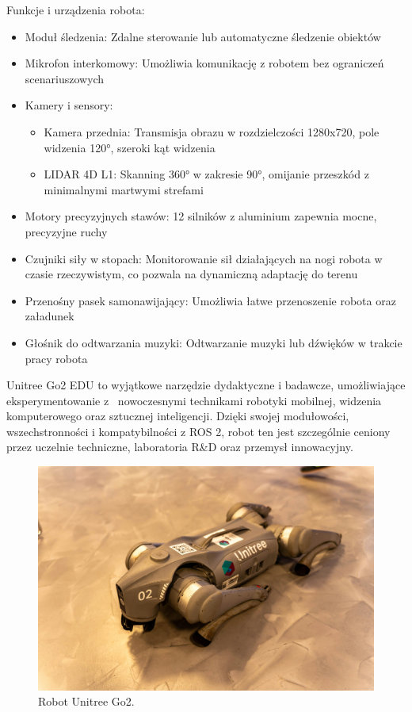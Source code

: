 \documentclass[12pt]{article}
\begin{document}
Funkcje i urządzenia robota:
\begin{itemize}
    \item Moduł śledzenia: Zdalne sterowanie lub automatyczne śledzenie obiektów
    \item Mikrofon interkomowy: Umożliwia komunikację z robotem bez ograniczeń scenariuszowych
    \item Kamery i sensory:
    \begin{itemize}
        \item Kamera przednia: Transmisja obrazu w rozdzielczości 1280x720, pole widzenia 120°, szeroki kąt widzenia
        \item LIDAR 4D L1: Skanning 360° w zakresie 90°, omijanie przeszkód z minimalnymi martwymi strefami
    \end{itemize}
    \item Motory precyzyjnych stawów: 12 silników z aluminium zapewnia mocne, precyzyjne ruchy
    \item Czujniki siły w stopach: Monitorowanie sił działających na nogi robota w czasie rzeczywistym, co pozwala na dynamiczną adaptację do terenu
    \item Przenośny pasek samonawijający: Umożliwia łatwe przenoszenie robota oraz załadunek
    \item Głośnik do odtwarzania muzyki: Odtwarzanie muzyki lub dźwięków w trakcie pracy robota
\end{itemize}


\noindent Unitree Go2 EDU to wyjątkowe narzędzie dydaktyczne i badawcze, umożliwiające eksperymentowanie z~ nowoczesnymi technikami robotyki mobilnej, widzenia komputerowego oraz sztucznej inteligencji. Dzięki swojej modułowości, wszechstronności i kompatybilności z ROS 2, robot ten jest szczególnie ceniony przez uczelnie techniczne, laboratoria R\&D oraz przemysł innowacyjny.


\begin{figure}[h]
    \centering
    \includegraphics[width=0.75\linewidth]{Zdjęcia/prawdziwyPies.jpg}
    \caption{Robot Unitree Go2.}
    \label{prawdziwyPies}
\end{figure}
\end{document}
